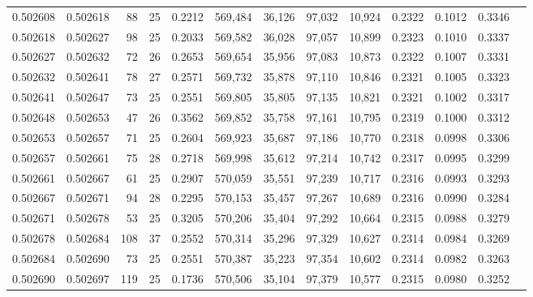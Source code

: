 \begin{tabular}{rrrrrrrrrrrrr}
0.502608 & 0.502618 &  88 &  25 &                                     0.2212 & 569,484 &  36,126 &  97,032 &  10,924 & 0.2322 & 0.1012 & 0.3346 \\
0.502618 & 0.502627 &  98 &  25 &                                     0.2033 & 569,582 &  36,028 &  97,057 &  10,899 & 0.2323 & 0.1010 & 0.3337 \\
0.502627 & 0.502632 &  72 &  26 &                                     0.2653 & 569,654 &  35,956 &  97,083 &  10,873 & 0.2322 & 0.1007 & 0.3331 \\
0.502632 & 0.502641 &  78 &  27 &                                     0.2571 & 569,732 &  35,878 &  97,110 &  10,846 & 0.2321 & 0.1005 & 0.3323 \\
0.502641 & 0.502647 &  73 &  25 &                                     0.2551 & 569,805 &  35,805 &  97,135 &  10,821 & 0.2321 & 0.1002 & 0.3317 \\
0.502648 & 0.502653 &  47 &  26 &                                     0.3562 & 569,852 &  35,758 &  97,161 &  10,795 & 0.2319 & 0.1000 & 0.3312 \\
0.502653 & 0.502657 &  71 &  25 &                                     0.2604 & 569,923 &  35,687 &  97,186 &  10,770 & 0.2318 & 0.0998 & 0.3306 \\
0.502657 & 0.502661 &  75 &  28 &                                     0.2718 & 569,998 &  35,612 &  97,214 &  10,742 & 0.2317 & 0.0995 & 0.3299 \\
0.502661 & 0.502667 &  61 &  25 &                                     0.2907 & 570,059 &  35,551 &  97,239 &  10,717 & 0.2316 & 0.0993 & 0.3293 \\
0.502667 & 0.502671 &  94 &  28 &                                     0.2295 & 570,153 &  35,457 &  97,267 &  10,689 & 0.2316 & 0.0990 & 0.3284 \\
0.502671 & 0.502678 &  53 &  25 &                                     0.3205 & 570,206 &  35,404 &  97,292 &  10,664 & 0.2315 & 0.0988 & 0.3279 \\
0.502678 & 0.502684 & 108 &  37 &                                     0.2552 & 570,314 &  35,296 &  97,329 &  10,627 & 0.2314 & 0.0984 & 0.3269 \\
0.502684 & 0.502690 &  73 &  25 &                                     0.2551 & 570,387 &  35,223 &  97,354 &  10,602 & 0.2314 & 0.0982 & 0.3263 \\
0.502690 & 0.502697 & 119 &  25 &                                     0.1736 & 570,506 &  35,104 &  97,379 &  10,577 & 0.2315 & 0.0980 & 0.3252 \\

\end{tabular}
